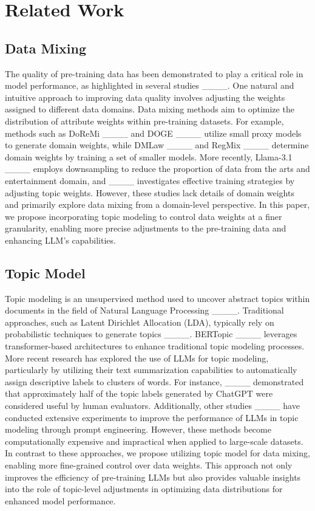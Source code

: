 \section{Related Work}
\subsection{Data Mixing} 
The quality of pre-training data has been demonstrated to play a critical role in model performance, as highlighted in several studies ____. 
One natural and intuitive approach to improving data quality involves adjusting the weights assigned to different data domains. 
Data mixing methods aim to optimize the distribution of attribute weights within pre-training datasets. 
For example, methods such as DoReMi ____ and DOGE ____ utilize small proxy models to generate domain weights, while DMLaw ____ and RegMix ____ determine domain weights by training a set of smaller models.
More recently, Llama-3.1 ____ employs downsampling to reduce the proportion of data from the arts and entertainment domain, and ____ investigates effective training strategies by adjusting topic weights. 
However, these studies lack details of domain weights and primarily explore data mixing from a domain-level perspective.
In this paper, we propose incorporating topic modeling to control data weights at a finer granularity, enabling more precise adjustments to the pre-training data and enhancing LLM's capabilities.

\subsection{Topic Model} 
Topic modeling is an unsupervised method used to uncover abstract topics within documents in the field of Natural Language Processing ____. 
Traditional approaches, such as Latent Dirichlet Allocation (LDA), typically rely on probabilistic techniques to generate topics ____. 
BERTopic ____ leverages transformer-based architectures to enhance traditional topic modeling processes.
More recent research has explored the use of LLMs for topic modeling, particularly by utilizing their text summarization capabilities to automatically assign descriptive labels to clusters of words. 
For instance, ____ demonstrated that approximately half of the topic labels generated by ChatGPT were considered useful by human evaluators. 
Additionally, other studies ____ have conducted extensive experiments to improve the performance of LLMs in topic modeling through prompt engineering.
However, these methods become computationally expensive and impractical when applied to large-scale datasets. 
In contrast to these approaches, we propose utilizing topic model for data mixing, enabling more fine-grained control over data weights. 
This approach not only improves the efficiency of pre-training LLMs but also provides valuable insights into the role of topic-level adjustments in optimizing data distributions for enhanced model performance.